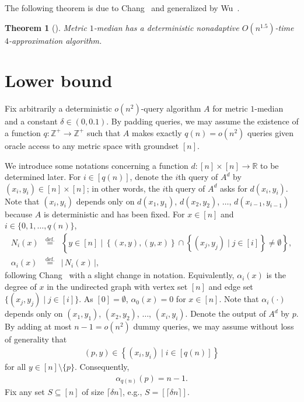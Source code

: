 \documentclass[letterpaper,12pt]{article}
\newtheorem{theorem}{Theorem}
\begin{document}
The following theorem is due to Chang~\cite{Cha13} and generalized by
Wu~\cite{Wu14}.

\begin{theorem}[{\cite{Cha13, Wu14}}]\label{nonadaptiveupperbound}
{\sc Metric $1$-median} has a deterministic nonadaptive $O(n^{1.5})$-time
$4$-approximation algorithm.
\end{theorem}

\section{Lower bound}

Fix arbitrarily a
deterministic
$o(n^2)$-query algorithm
$A$
for {\sc metric $1$-median}
and a constant
$\delta\in(0,0.1)$.
By padding queries, we may assume the existence of a function
$q\colon\mathbb{Z}^+\to\mathbb{Z}^+$ such that $A$ makes exactly
$q(n)=o(n^2)$ queries given oracle access to any metric space with groundset
$[n]$.

We introduce some notations concerning a function
$d\colon[n]\times[n]\to\mathbb{R}$
to be determined later.
For $i\in[q(n)]$, denote the $i$th query of $A^d$ by
$(x_i,y_i)\in[n]\times[n]$; in other
words, the $i$th query of $A^d$ asks for $d(x_i,y_i)$.
Note that $(x_i,y_i)$ depends only on $d(x_1,y_1)$, $d(x_2,y_2)$,
$\ldots$, $d(x_{i-1},y_{i-1})$ because $A$
is deterministic and
has been fixed.
For $x\in[n]$ and $i\in\{0,1,\ldots,q(n)\}$,
\begin{eqnarray}
N_i(x)
&\stackrel{\text{def.}}{=}&
\left\{
y\in[n]\mid
\left\{
\left(x,y\right), \left(y,x\right)
\right\}
\cap \left\{\left(x_j,y_j\right)\mid
j\in\left[i\right]\right\}
\neq\emptyset
\right\},
\label{neighborhoodinsubgraph}\\
\alpha_i(x)
&\stackrel{\text{def.}}{=}&
\left|\,
N_i(x)
\,\right|,
\label{numberoffrozenincidentdistances}
\end{eqnarray}
following Chang~\cite{Cha12} with a slight change in notation.
Equivalently, $\alpha_i(x)$ is the degree of $x$ in the undirected graph
with vertex set $[n]$ and edge set $\{(x_j,y_j)\mid j\in[i]\}$.
As $[0]=\emptyset$,
$\alpha_0(x)=0$ for $x\in[n]$.
Note that
$\alpha_i(\cdot)$ depends only on
$(x_1,y_1)$, $(x_2,y_2)$, $\ldots$, $(x_i,y_i)$.
Denote the
output of $A^d$
by $p$.
By adding at most $n-1=o(n^2)$ dummy queries,
we may
assume without loss of generality that
\begin{eqnarray}
\left(p,y\right)\in\left\{\left(x_i,y_i\right)\mid i\in\left[q(n)\right]\right\}
\label{algorithmoutputheavilyqueried}
\end{eqnarray}
for all $y\in[n]\setminus\{p\}$.
Consequently,
\begin{eqnarray}
\alpha_{q(n)}(p)=n-1.\label{outputallasked}
\end{eqnarray}
Fix any set $S\subseteq [n]$ of size $\lceil\delta n\rceil$,
e.g., $S=[\lceil\delta n\rceil]$.
\end{document}
